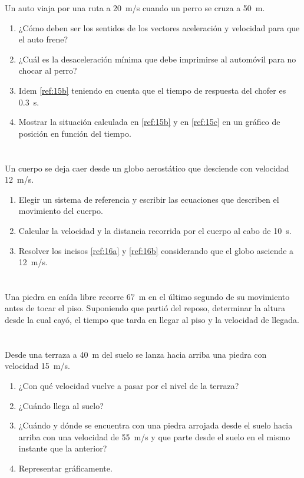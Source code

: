 \documentclass[a4paper, 12pt, fleqn]{article}
\begin{document}
Un auto viaja por una ruta a \SI{20}{m/s} cuando un perro se cruza a \SI{50}{m}.
    \begin{enumerate}[label=(\alph*)]
        \item ¿Cómo deben ser los sentidos de los vectores aceleración y velocidad para que el auto frene?
        \item ¿Cuál es la desaceleración mínima que debe imprimirse al automóvil para no chocar al perro? \label{ref:15b}
        \item Idem \ref{ref:15b} teniendo en cuenta que el tiempo de respuesta del chofer es \SI{0,3}{s}. \label{ref:15c}
        \item Mostrar la situación calculada en \ref{ref:15b} y en \ref{ref:15c} en un gráfico de posición en función del tiempo.
    \end{enumerate}

\section{}

Un cuerpo se deja caer desde un globo aerostático que desciende con velocidad \SI{12}{m/s}.
    \begin{enumerate}[label=(\alph*)]
        \item Elegir un sistema de referencia y escribir las ecuaciones que describen el movimiento del cuerpo. \label{ref:16a}
        \item Calcular la velocidad y la distancia recorrida por el cuerpo al cabo de \SI{10}{s}. \label{ref:16b}
        \item Resolver los incisos \ref{ref:16a} y \ref{ref:16b} considerando que el globo asciende a \SI{12}{m/s}.
    \end{enumerate}
    
\section{}

Una piedra en caída libre recorre \SI{67}{m} en el último segundo de su movimiento antes de tocar el piso. Suponiendo que partió del reposo, determinar la altura desde la cual cayó, el tiempo que tarda en llegar al piso y la velocidad de llegada.

\section{}

Desde una terraza a \SI{40}{m} del suelo se lanza hacia arriba una piedra con velocidad \SI{15}{m/s}.
    \begin{enumerate}[label=(\alph*)]
        \item ¿Con qué velocidad vuelve a pasar por el nivel de la terraza?
        \item ¿Cuándo llega al suelo?
        \item ¿Cuándo y dónde se encuentra con una piedra arrojada desde el suelo hacia arriba con una velocidad de \SI{55}{m/s} y que parte desde el suelo en el mismo instante que la anterior?
        \item Representar gráficamente.
    \end{enumerate}
\end{document}
